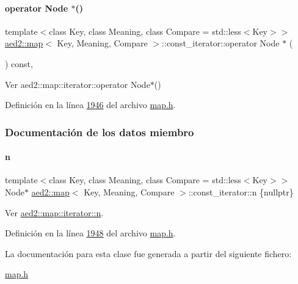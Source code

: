 \paragraph{\texorpdfstring{operator Node $\ast$()}{operator Node *()}}
{\footnotesize\ttfamily template$<$class Key, class Meaning, class Compare = std\+::less$<$\+Key$>$$>$ \\
\hyperlink{classaed2_1_1map}{aed2\+::map}$<$ Key, Meaning, Compare $>$\+::const\+\_\+iterator\+::operator Node $\ast$ (\begin{DoxyParamCaption}{ }\end{DoxyParamCaption}) const\hspace{0.3cm}{\ttfamily [inline]}, {\ttfamily [private]}}



Ver aed2\+::map\+::iterator\+::operator Node$\ast$() 



Definición en la línea \hyperlink{map_8h_source_l01946}{1946} del archivo \hyperlink{map_8h_source}{map.\+h}.



\subsubsection{Documentación de los datos miembro}
\mbox{\label{classaed2_1_1map_1_1const__iterator_a921e123f9c7f94610cf9fee3ab55d277_a921e123f9c7f94610cf9fee3ab55d277}} 
\paragraph{\texorpdfstring{n}{n}}
{\footnotesize\ttfamily template$<$class Key, class Meaning, class Compare = std\+::less$<$\+Key$>$$>$ \\
Node$\ast$ \hyperlink{classaed2_1_1map}{aed2\+::map}$<$ Key, Meaning, Compare $>$\+::const\+\_\+iterator\+::n \{nullptr\}\hspace{0.3cm}{\ttfamily [private]}}



Ver \hyperlink{classaed2_1_1map_1_1iterator_adf8633ef71bb6c1fc01c0abe8728fd93_adf8633ef71bb6c1fc01c0abe8728fd93}{aed2\+::map\+::iterator\+::n}. 



Definición en la línea \hyperlink{map_8h_source_l01948}{1948} del archivo \hyperlink{map_8h_source}{map.\+h}.



La documentación para esta clase fue generada a partir del siguiente fichero\+:\begin{DoxyCompactItemize}
\item 
\hyperlink{map_8h}{map.\+h}\end{DoxyCompactItemize}
